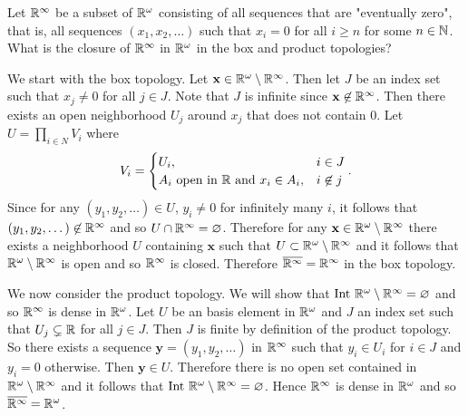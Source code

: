 \begin{ex}{19.7}
    Let $\mathbb{R}^\infty$ be a subset of $\mathbb{R}^\omega$ consisting of all sequences that are 
    "eventually zero", that is, all sequences $(x_1,x_2,\dots)$ such that $x_i=0$ for 
    all $i\geq n$ for some $n\in\mathbb{N}$.
    What is the closure of $\mathbb{R}^\infty$ in $\mathbb{R}^\omega$ in the box and product topologies?
\end{ex}
\begin{sol}
    We start with the box topology. Let $\mathbf{x}\in\mathbb{R}^\omega\setminus\mathbb{R}^\infty$. 
    Then let $J$ be an index set such that $x_j\neq 0$ for all $j\in J$. 
    Note that $J$ is infinite since $\mathbf{x}\not\in\mathbb{R}^\infty$.
    Then there exists an open neighborhood $U_j$ around $x_j$ that does not contain 0.
    Let $U=\prod_{i\in N} V_i$ where
    $$V_i=\begin{cases}
        U_i,& i\in J\\
        A_i\text{ open in $\mathbb{R}$ and } x_i\in A_i,&i\not\in j
    \end{cases}.$$
    Since for any $(y_1,y_2,\dots)\in U$, $y_i\neq 0$ for infinitely many $i$, it follows that 
    $(y_1,y_2,\dots)\not\in\mathbb{R}^\infty$ and so $U\cap\mathbb{R}^\infty=\varnothing$.
    Therefore for any $\mathbf{x}\in\mathbb{R}^\omega\setminus\mathbb{R}^\infty$ there exists a neighborhood $U$ 
    containing $\mathbf{x}$ such that $U\subset\mathbb{R}^\omega\setminus\mathbb{R}^\infty$ and it follows that 
    $\mathbb{R}^\omega\setminus\mathbb{R}^\infty$ is open and so $\mathbb{R}^\infty$ is closed.
    Therefore $\overline{\mathbb{R}^\infty}=\mathbb{R}^\infty$ in the box topology.

    We now consider the product topology. 
    We will show that $\text{Int } \mathbb{R}^\omega\setminus\mathbb{R}^\infty =\varnothing$ and so $\mathbb{R}^\infty$ is dense in $\mathbb{R}^\omega$.
    Let $U$ be an basis element in $\mathbb{R}^\omega$ and $J$ an index set such that $U_j\subsetneq\mathbb{R}$ for all $j\in J$.
    Then $J$ is finite by definition of the product topology. 
    So there exists a sequence $\mathbf{y}=(y_1,y_2,\dots)$ in $\mathbb{R}^\infty$ such that $y_i\in U_i$ for $i\in J$ and $y_i=0$ otherwise.
    Then $\mathbf{y}\in U$. Therefore there is no open set contained in $\mathbb{R}^\omega\setminus\mathbb{R}^\infty$ and it follows that $\text{Int } \mathbb{R}^\omega\setminus\mathbb{R}^\infty =\varnothing$.
    Hence $\mathbb{R}^\infty$ is dense in $\mathbb{R}^\omega$ and so $\overline{\mathbb{R}^\infty}=\mathbb{R}^\omega$. 
\end{sol}

